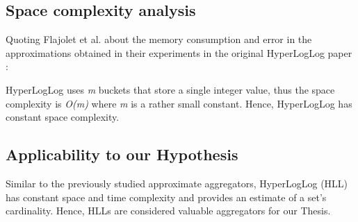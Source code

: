 \subsection*{Space complexity analysis}
Quoting Flajolet et al. about the memory consumption and error in the approximations obtained in their experiments in the original HyperLogLog paper \cite{Flajolet-HLL}: 

HyperLogLog uses \textit{m} buckets that store a single integer value, thus the space complexity is \textit{O(m)} where \textit{m} is a rather small constant. Hence, HyperLogLog has constant space complexity.

\subsection*{Applicability to our Hypothesis}
Similar to the previously studied approximate aggregators, HyperLogLog (HLL) has constant space and time complexity and provides an estimate of a set's cardinality. Hence, HLLs are considered valuable aggregators for our Thesis.

